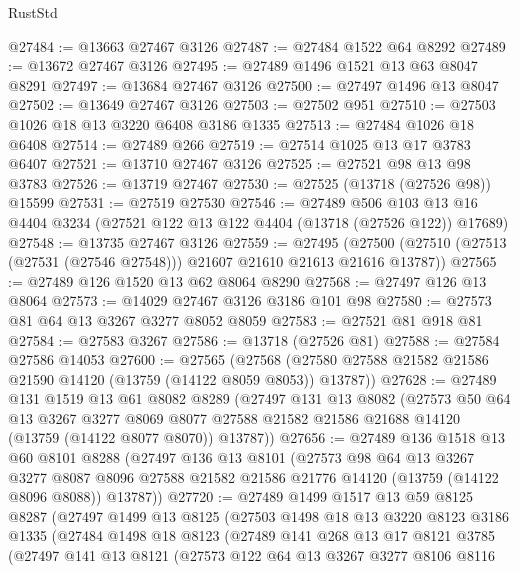 \begin{lexlean}{RustStd}
\begin{coremodule}
@27484 := @13663 @27467 @3126
@27487 := @27484 @1522 @64 @8292
@27489 := @13672 @27467 @3126
@27495 := @27489 @1496 @1521 @13 @63 @8047 @8291
@27497 := @13684 @27467 @3126
@27500 := @27497 @1496 @13 @8047
@27502 := @13649 @27467 @3126
@27503 := @27502 @951
@27510 := @27503 @1026 @18 @13 @3220 @6408 @3186 @1335
@27513 := @27484 @1026 @18 @6408
@27514 := @27489 @266
@27519 := @27514 @1025 @13 @17 @3783 @6407
@27521 := @13710 @27467 @3126
@27525 := @27521 @98 @13 @98 @3783
@27526 := @13719 @27467
@27530 := @27525 (@13718 (@27526 @98)) @15599
@27531 := @27519 @27530
@27546 := @27489
    @506
    @103
    @13
    @16
    @4404
    @3234
    (@27521 @122 @13 @122 @4404 (@13718 (@27526 @122)) @17689)
@27548 := @13735 @27467 @3126
@27559 := @27495
    (@27500 (@27510 (@27513 (@27531 (@27546 @27548))) @21607 @21610 @21613 @21616 @13787))
@27565 := @27489 @126 @1520 @13 @62 @8064 @8290
@27568 := @27497 @126 @13 @8064
@27573 := @14029 @27467 @3126 @3186 @101 @98
@27580 := @27573 @81 @64 @13 @3267 @3277 @8052 @8059
@27583 := @27521 @81 @918 @81
@27584 := @27583 @3267
@27586 := @13718 (@27526 @81)
@27588 := @27584 @27586 @14053
@27600 := @27565
    (@27568 (@27580 @27588 @21582 @21586 @21590 @14120 (@13759 (@14122 @8059 @8053)) @13787))
@27628 := @27489
    @131
    @1519
    @13
    @61
    @8082
    @8289
    (@27497
      @131
      @13
      @8082
      (@27573
        @50
        @64
        @13
        @3267
        @3277
        @8069
        @8077
        @27588
        @21582
        @21586
        @21688
        @14120
        (@13759 (@14122 @8077 @8070))
        @13787))
@27656 := @27489
    @136
    @1518
    @13
    @60
    @8101
    @8288
    (@27497
      @136
      @13
      @8101
      (@27573
        @98
        @64
        @13
        @3267
        @3277
        @8087
        @8096
        @27588
        @21582
        @21586
        @21776
        @14120
        (@13759 (@14122 @8096 @8088))
        @13787))
@27720 := @27489
    @1499
    @1517
    @13
    @59
    @8125
    @8287
    (@27497
      @1499
      @13
      @8125
      (@27503
        @1498
        @18
        @13
        @3220
        @8123
        @3186
        @1335
        (@27484
          @1498
          @18
          @8123
          (@27489
            @141
            @268
            @13
            @17
            @8121
            @3785
            (@27497
              @141
              @13
              @8121
              (@27573
                @122
                @64
                @13
                @3267
                @3277
                @8106
                @8116

\end{coremodule}
\end{lexlean}
